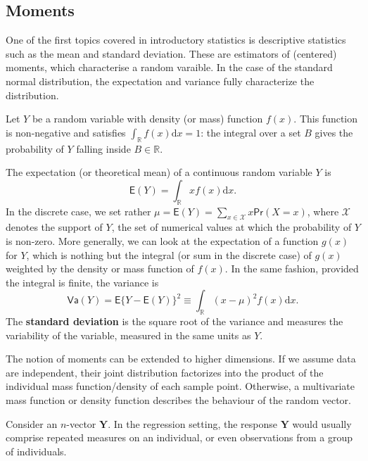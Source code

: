 \documentclass[
  11pt,
  letterpaper,
]{book}
\theoremstyle{definition}
\theoremstyle{definition}
\theoremstyle{definition}
\theoremstyle{remark}
\begin{document}
\hypertarget{moments}{%
\subsection{Moments}\label{moments}}

One of the first topics covered in introductory statistics is descriptive statistics such as the mean and standard deviation. These are estimators of (centered) moments, which characterise a random varaible. In the case of the standard normal distribution, the expectation and variance fully characterize the distribution.

Let \(Y\) be a random variable with density (or mass) function \(f(x)\). This function is non-negative and satisfies \(\int_{\mathbb{R}} f(x) \mathrm{d}x=1\): the integral over a set \(B\) gives the probability of \(Y\) falling inside \(B \in \mathbb{R}\).

The expectation (or theoretical mean) of a continuous random variable \(Y\) is \[\mathsf{E}(Y)=\int_{\mathbb{R}} x f(x) \mathrm{d} x.\]
In the discrete case, we set rather \(\mu = \mathsf{E}(Y)=\sum_{x \in \mathcal{X}} x \mathsf{Pr}(X=x)\), where \(\mathcal{X}\) denotes the support of \(Y\), the set of numerical values at which the probability of \(Y\) is non-zero.
More generally, we can look at the expectation of a function \(g(x)\) for \(Y\), which is nothing but the integral (or sum in the discrete case) of \(g(x)\) weighted by the density or mass function of \(f(x)\). In the same fashion, provided the integral is finite, the variance is
\[\mathsf{Va}(Y)=\mathsf{E}\{Y-\mathsf{E}(Y)\}^2 \equiv \int_{\mathbb{R}} (x-\mu)^2 f(x) \mathrm{d} x.\]
The \textbf{standard deviation} is the square root of the variance and measures the variability of the variable, measured in the same units as \(Y\).

The notion of moments can be extended to higher dimensions. If we assume data are independent, their joint distribution factorizes into the product of the individual mass function/density of each sample point. Otherwise, a multivariate mass function or density function describes the behaviour of the random vector.

Consider an \(n\)-vector \(\boldsymbol{Y}\). In the regression setting, the response \(\boldsymbol{Y}\) would usually comprise repeated measures on an individual, or even observations from a group of individuals.
\end{document}
